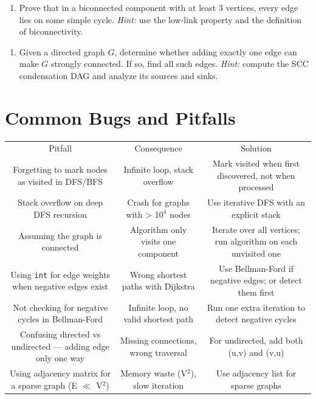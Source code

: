 \begin{enumerate}
\item Prove that in a biconnected component with at least 3 vertices, every edge lies on some simple cycle. \textit{Hint:} use the low-link property and the definition of biconnectivity.
\end{enumerate}

\begin{enumerate}
\item Given a directed graph $G$, determine whether adding exactly one edge can make $G$ strongly connected. If so, find all such edges. \textit{Hint:} compute the SCC condensation DAG and analyze its sources and sinks.
\end{enumerate}

\section{Common Bugs and Pitfalls}

\begin{center}
\begin{tabular}{ccc}
\toprule
Pitfall & Consequence & Solution \\
Forgetting to mark nodes as visited in DFS/BFS & Infinite loop, stack overflow & Mark visited when first discovered, not when processed \\
Stack overflow on deep DFS recursion & Crash for graphs with > 1$0^{4}$ nodes & Use iterative DFS with an explicit stack \\
Assuming the graph is connected & Algorithm only visits one component & Iterate over all vertices; run algorithm on each unvisited one \\
Using \texttt{int} for edge weights when negative edges exist & Wrong shortest paths with Dijkstra & Use Bellman-Ford if negative edges; or detect them first \\
Not checking for negative cycles in Bellman-Ford & Infinite loop, no valid shortest path & Run one extra iteration to detect negative cycles \\
Confusing directed vs undirected — adding edge only one way & Missing connections, wrong traversal & For undirected, add both (u,v) and (v,u) \\
Using adjacency matrix for a sparse graph (E $\ll$ V$^{2}$) & Memory waste (V$^{2}$), slow iteration & Use adjacency list for sparse graphs \\

\bottomrule
\end{tabular}
\end{center}
